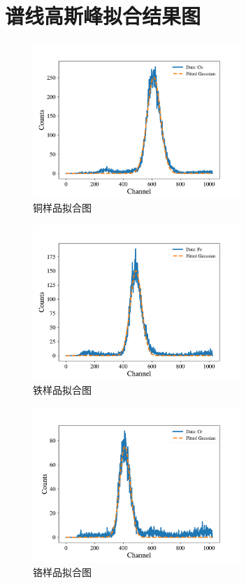 \documentclass{article}
\begin{document}
    \section{谱线高斯峰拟合结果图}
    \begin{figure}[htbp]
        \centering
        \includegraphics[width=0.7\textwidth]{../plot/Fitted_Cu.pdf}
        \caption{铜样品拟合图\label{fig:Fitted_Cu}}
    \end{figure}
    \begin{figure}[htbp]
        \centering
        \includegraphics[width=0.7\textwidth]{../plot/Fitted_Fe.pdf}
        \caption{铁样品拟合图\label{fig:Fitted_Fe}}
    \end{figure}
    \begin{figure}[htbp]
        \centering
        \includegraphics[width=0.7\textwidth]{../plot/Fitted_Cr.pdf}
        \caption{铬样品拟合图\label{fig:Fitted_Cr}}
    \end{figure}
\end{document}
